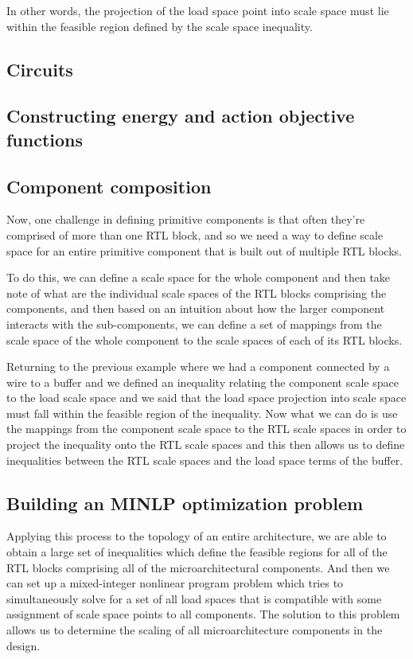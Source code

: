 In other words, the projection of the load space point into scale space must lie within the feasible region defined by the scale space inequality.

\subsection{Circuits}

\subsection{Constructing energy and action objective functions}



\subsection{Component composition}

Now, one challenge in defining primitive components is that often they're comprised of more than one RTL block, and so we need a way to define scale space for an entire primitive component that is built out of multiple RTL blocks.

To do this, we can define a scale space for the whole component and then take note of what are the individual scale spaces of the RTL blocks comprising the components, and then based on an intuition about how the larger component interacts with the sub-components, we can define a set of mappings from the scale space of the whole component to the scale spaces of each of its RTL blocks.

Returning to the previous example where we had a component connected by a wire to a buffer and we defined an inequality relating the component scale space to the load scale space and we said that the load space projection into scale space must fall within the feasible region of the inequality. Now what we can do is use the mappings from the component scale space to the RTL scale spaces in order to project the inequality onto the RTL scale spaces and this then allows us to define inequalities between the RTL scale spaces and the load space terms of the buffer.

\subsection{Building an MINLP optimization problem}

Applying this process to the topology of an entire architecture, we are able to obtain a large set of inequalities which define the feasible regions for all of the RTL blocks comprising all of the microarchitectural components. And then we can set up a mixed-integer nonlinear program problem which tries to simultaneously solve for a set of all load spaces that is compatible with some assignment of scale space points to all components. The solution to this problem allows us to determine the scaling of all microarchitecture components in the design.

